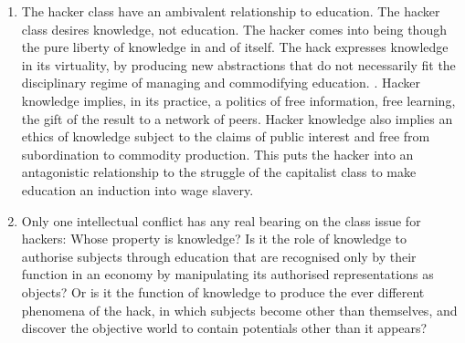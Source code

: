 \documentclass[letterpaper,12pt,english]{sphinxmanual}
\begin{document}
\begin{enumerate}
\item {} 
The hacker class have an ambivalent relationship to education. The hacker class desires knowledge, not education. The hacker comes into being though the pure liberty of knowledge in and of itself. The hack expresses knowledge in its virtuality, by producing new abstractions that do not necessarily fit the disciplinary regime of managing and commodifying education. . Hacker knowledge implies, in its practice, a politics of free information, free learning, the gift of the result to a network of peers. Hacker knowledge also implies an ethics of knowledge subject to the claims of public interest and free from subordination to commodity production. This puts the hacker into an antagonistic relationship to the struggle of the capitalist class to make education an induction into wage slavery.

\item {} 
Only one intellectual conflict has any real bearing on the class issue for hackers: Whose property is knowledge? Is it the role of knowledge to authorise subjects through education that are recognised only by their function in an economy by manipulating its authorised representations as objects? Or is it the function of knowledge to produce the ever different phenomena of the hack, in which subjects become other than themselves, and discover the objective world to contain potentials other than it appears?

\end{enumerate}
\end{document}
